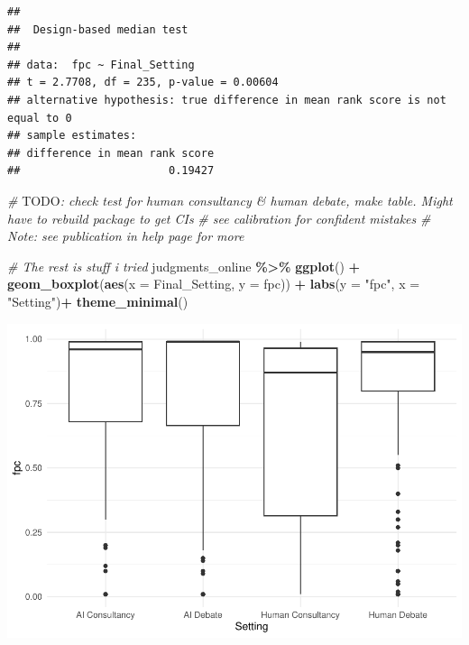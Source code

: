 \documentclass[
]{article}
\newenvironment{Shaded}{\begin{snugshade}}{\end{snugshade}}
\newcommand{\AlertTok}[1]{\textcolor[rgb]{0.94,0.16,0.16}{#1}}
\newcommand{\AttributeTok}[1]{\textcolor[rgb]{0.13,0.29,0.53}{#1}}
\newcommand{\CommentTok}[1]{\textcolor[rgb]{0.56,0.35,0.01}{\textit{#1}}}
\newcommand{\FunctionTok}[1]{\textcolor[rgb]{0.13,0.29,0.53}{\textbf{#1}}}
\newcommand{\NormalTok}[1]{#1}
\newcommand{\SpecialCharTok}[1]{\textcolor[rgb]{0.81,0.36,0.00}{\textbf{#1}}}
\newcommand{\StringTok}[1]{\textcolor[rgb]{0.31,0.60,0.02}{#1}}
\begin{document}
\begin{verbatim}
## 
##  Design-based median test
## 
## data:  fpc ~ Final_Setting
## t = 2.7708, df = 235, p-value = 0.00604
## alternative hypothesis: true difference in mean rank score is not equal to 0
## sample estimates:
## difference in mean rank score 
##                       0.19427
\end{verbatim}

\begin{Shaded}
\begin{Highlighting}[]
\CommentTok{\# }\AlertTok{TODO}\CommentTok{: check test for human consultancy \& human debate, make table. Might have to rebuild package to get CIs}
\CommentTok{\# see calibration for confident mistakes}
\CommentTok{\# Note: see publication in help page for more}



\CommentTok{\# The rest is stuff i tried}
\NormalTok{judgments\_online }\SpecialCharTok{\%\textgreater{}\%}
  \FunctionTok{ggplot}\NormalTok{() }\SpecialCharTok{+}
  \FunctionTok{geom\_boxplot}\NormalTok{(}\FunctionTok{aes}\NormalTok{(}\AttributeTok{x =}\NormalTok{ Final\_Setting, }\AttributeTok{y =}\NormalTok{ fpc)) }\SpecialCharTok{+}
  \FunctionTok{labs}\NormalTok{(}\AttributeTok{y =} \StringTok{"fpc"}\NormalTok{, }\AttributeTok{x =} \StringTok{"Setting"}\NormalTok{)}\SpecialCharTok{+}
  \FunctionTok{theme\_minimal}\NormalTok{()}
\end{Highlighting}
\end{Shaded}

\includegraphics{debate-2309_files/figure-latex/final probability correct-1.pdf}
\end{document}
